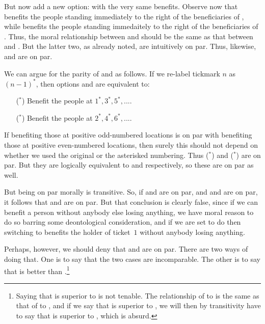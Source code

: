 But now add a new option:
with the very same benefits. 
Observe now that  benefits the people standing immediately to the right of 
the beneficiaries of , while  benefits the people standing 
immedaitely to the right of the beneficiaries of . Thus,
the moral relationship between  and  should be the same as that
between  and . 
But the latter two, as already noted, are intuitively on par. 
Thus, likewise,  and  are on par. 

We can argue for the parity of  and  as follows. If we re-label 
tickmark $n$ as $(n-1)^*$, then options  and  are equivalent to:
\begin{itemize}
	\item[(\bref{benefit-even}$^*$)]{Benefit the people at $1^*,3^*,5^*,...$.}
	\item[(\bref{benefit-odd-3}$^*$)]{Benefit the people at $2^*,4^*,6^*,...$.}
\end{itemize}
If benefiting those at positive odd-numbered locations is on par with benefiting those at positive 
even-numbered locations, then surely this should not depend on whether we used the original or 
the asterisked numbering. Thus ($^*$) and ($^*$) are on par.
But they are logically equivalent to  and  respectively, so these
are on par as well.

But being on par morally is transitive. So, if  and  are on par,
and  and  are on par, it follows that 
and  are on par. But that conclusion is clearly false, since if we can benefit a 
person without anybody else losing anything, we have moral reason to do so barring some deontological consideration,
and if we are set to do  then switching to  benefits the holder of 
ticket~$1$ without anybody losing anything.

Perhaps, however, we should deny that  and  are on par. There are two
ways of doing that. One is to say that the two cases are incomparable. The other is to say that 
is better than .\footnote{Saying that  is superior to 
 is not tenable. The relationship of  to  is the 
same as that of  to , and if we say that  is superior
to , we will then by transitivity have to say that  is superior to 
, which is absurd.}

